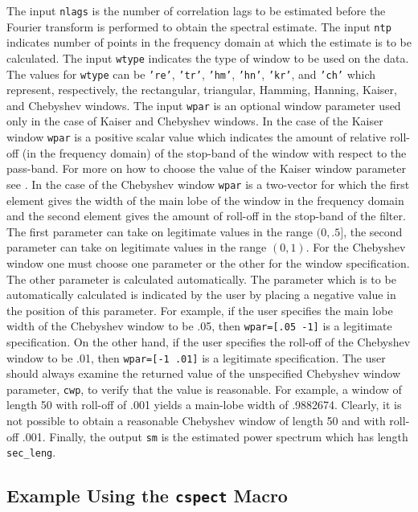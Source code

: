 	The input {\tt nlags} 
is the number of correlation lags to be estimated before the Fourier transform
is performed to obtain the spectral estimate.  The input {\tt ntp}
indicates number of points in the frequency domain at which the estimate
is to be calculated.
The input {\tt wtype} indicates the type of window 
to be used on the data.  The values for {\tt wtype} can be
{\tt 're'}, {\tt 'tr'}, {\tt 'hm'}, {\tt 'hn'}, {\tt 'kr'}, and {\tt 'ch'}
which represent, respectively, the rectangular, triangular, Hamming,
Hanning, Kaiser, and Chebyshev windows.  The input {\tt wpar} is
an optional window parameter used only in the case of Kaiser and
Chebyshev windows.  In the case of the Kaiser window {\tt wpar} is
a positive scalar value which indicates the amount of relative roll-off 
(in the frequency domain)
of the stop-band of the window with respect to the pass-band.  
For more on how to choose the value of the Kaiser window parameter
see \cite{rabiner}.
In the case of the Chebyshev window
{\tt wpar} is a two-vector for which the first element gives the
width of the main lobe of the window in the frequency domain and the 
second element gives the amount of roll-off in the stop-band
of the filter.  
The first parameter can take on legitimate values in the range $(0,.5]$,
the second parameter can take on legitimate values in the range $(0,1)$.
For the Chebyshev window one must choose one parameter
or the other for the window specification.  The other parameter is 
calculated automatically.  The parameter which is to be automatically
calculated is indicated by the user by placing a negative value in the position
of this parameter.  For example, if the user specifies the main lobe
width of the Chebyshev window to be .05, then {\tt wpar=[.05 -1]} is
a legitimate specification.  On the other hand, if the user specifies
the roll-off of the Chebyshev window to be .01, then {\tt wpar=[-1 .01]}
is a legitimate specification.  The user should always examine the returned
value of the unspecified Chebyshev window parameter, {\tt cwp}, to verify that
the value is reasonable.  For example, a window of length 50 with roll-off
of .001 yields a main-lobe width of .9882674.  Clearly, it is not possible
to obtain a reasonable Chebyshev window of length 50 and with roll-off
.001.  Finally, the output {\tt sm} is the estimated power spectrum
which has length {\tt sec\_leng}.

\subsection{Example Using the {\tt cspect} Macro}

